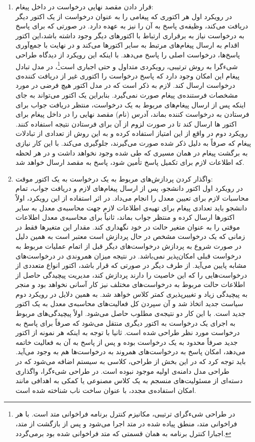 \begin{enumerate}
\item قرار دادن مقصد نهایی درخواست در داخل پیغام:\\
در رویکرد اول هر اکتوری که پیغامی را به عنوان درخواست از یک اکتور دیگر دریافت می‌کند، وظیفه‌ی پاسخ به آن را نیز به عهده دارد. در صورتی که برای پاسخ به درخواست نیاز به برقراری ارتباط با اکتورهای دیگر وجود داشته باشد،‌این اکتور اقدام به ارسال پیغام‌های مرتبط به سایر اکتورها می‌کند و در نهایت با جمع‌آوری پاسخ‌ها، درخواست اصلی را پاسخ می‌دهد. با اینکه این رویکرد از دیدگاه طراحی شیءگرا به روش ترتیبی،‌ رویکردی متداول و حتی اجباری است\footnote{در طراحی شیءگرای ترتیبی، مکانیزم کنترل برنامه فراخوانی متد است. با هر فراخوانی متد، منطق پیاده شده در متد اجرا می‌شود و پس از بازگشت از متد، اجبارا کنترل برنامه به همان قسمتی که متد فراخوانی شده بود برمی‌گردد.}، در مدل تبادل پیغام این امکان وجود دارد که پاسخ درخواست را اکتوری غیر از دریافت کننده‌ی درخواست ارسال کند. لازم به ذکر است که در مدل اکتور هیچ فرضی در مورد مشخصات فرستنده‌ی پیغام صورت نمی‌گیرد. بنابراین یک اکتور می‌تواند به جای اینکه پس از ارسال پیغام‌های مربوط به یک درخواست، منتظر دریافت جواب برای فرستادن به درخواست کننده بماند،‌ آدرس (نام) مقصد نهایی را در داخل پیغام برای اکتور ها ارسال کند تا در صورت لزوم از آن برای فرستادن نتیجه استفاده کنند. رویکرد دوم در واقع از این امتیاز استفاده کرده و به این روش از تعدادی از تبادلات پیغام که صرفاً به دلیل ذکر شده صورت می‌گیرند، جلوگیری می‌کند. با این کار نیازی به برگشت پیغام در همان مسیری که طی شده وجود نخواهد داشت و در هر لحظه که اطلاعات لازم برای تکمیل پاسخ تأمین شود، پاسخ به مقصد ارسال خواهد شد.
\item واگذار کردن پردازش‌های مربوط به یک درخواست به یک اکتور موقت:\\
 در رویکرد اول اکتور دانشجو، پس از ارسال پیغام‌های لازم و دریافت جواب، تمام محاسبات لازم برای تعیین معدل را انجام ‌می‌داد. در اثر استفاده از این رویکرد، اولاً دانشجو باید تعدادی پیغام برای تهیه‌ی اطلاعات لازم جهت محاسبه‌ی معدل به سایر اکتورها ارسال کرده و منتظر جواب بماند، ثانیاً برای محاسبه‌ی معدل اطلاعات موقتی را به عنوان متغیر حالت در خود نگهداری کند. مقدار این متغیر‌ها فقط در زمانی که یک درخواست مشخص در حال پردازش است معتبر است به همین دلیل در صورت شروع به پردازش درخواست‌های دیگر قبل از اتمام عملیات مربوط به درخواست قبلی امکان‌پذیر نمی‌باشد. در نتیجه میزان همروندی در درخواست‌های مشابه پایین می‌آید. از طرف دیگر در صورتی که قرار باشد، اکتور انواع متعددی از درخواست‌هایی را که این خاصیت را دارند پردازش کند، مدیریت پیچیدگی حاصل از اطلاعات حالت مربوط به درخواست‌های مختلف نیز کار آسانی نخواهد بود و منجر به پیچیدگی زیاد  و تغییرپذیری کمتر کلاس خواهد شد. به همین دلایل در رویکرد دوم سیاست جدید اتخاذ شد و آن سپردن کل فعالیت‌های محاسبه‌ی معدل به یک اکتور جدید است. با این کار دو نتیجه‌ی مطلوب حاصل می‌شود. اولاً پیچیدگی‌های مربوط به اجرای یک درخواست به اکتور دیگری منتقل می‌شود که صرفاً برای پاسخ به درخواست مورد نظر طراحی شده است. ثانیا با توجه به اینکه هر نمونه از اکتور جدید صرفاً محدود به یک درخواست بوده و پس از پاسخ به‌ آن به فعالیت خاتمه می‌دهد، امکان پاسخ به درخواست‌های همروند به درخواست‌ها هم به وجود می‌آید. باید توجه کرد که در این بخش از طراحی، کلاسی به سیستم اضافه می‌شود که در طراحی مدل دامنه‌ی اولیه موجود نبوده است. در طراحی شیءگرا، واگذاری دسته‌ای از مسئولیت‌های منسجم به یک کلاس مصنوعی یا کمکی  به اهدافی مانند امکان استفاده‌ی مجدد، با عنوان ساخت ناب شناخته شده است\cite{Larman_2004}.

\end{enumerate}
